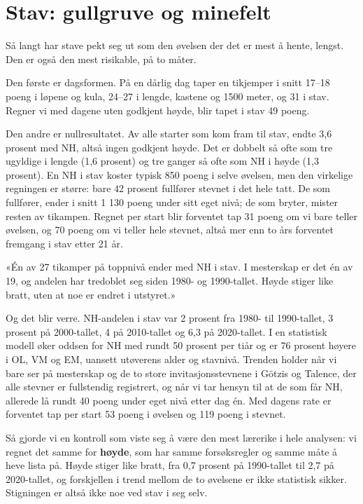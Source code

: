 \section{Stav: gullgruve og minefelt}\label{stav-gullgruve-og-minefelt}

Så langt har stave pekt seg ut som den øvelsen der det er mest å hente, lengst. Den er også den mest risikable, på to måter.

Den første er dagsformen. På en dårlig dag taper en tikjemper i snitt 17--18 poeng i løpene og kula, 24--27 i lengde, kastene og 1500 meter, og 31 i stav. Regner vi med dagene uten godkjent høyde, blir tapet i stav 49 poeng.

Den andre er nullresultatet. Av alle starter som kom fram til stav, endte 3,6 prosent med NH, altså ingen godkjent høyde. Det er dobbelt så ofte som tre ugyldige i lengde (1,6 prosent) og tre ganger så ofte som NH i høyde (1,3 prosent). En NH i stav koster typisk 850 poeng i selve øvelsen, men den virkelige regningen er større: bare 42 prosent fullfører stevnet i det hele tatt. De som fullfører, ender i snitt 1 130 poeng under sitt eget nivå; de som bryter, mister resten av tikampen. Regnet per start blir forventet tap 31 poeng om vi bare teller øvelsen, og 70 poeng om vi teller hele stevnet, altså mer enn to års forventet fremgang i stav etter 21 år.

\begin{sitat}

«Én av 27 tikamper på toppnivå ender med NH i stav. I mesterskap er det én av 19, og andelen har tredoblet seg siden 1980- og 1990-tallet. Høyde stiger like bratt, uten at noe er endret i utstyret.»

\end{sitat}

Og det blir verre. NH-andelen i stav var 2 prosent fra 1980- til 1990-tallet, 3 prosent på 2000-tallet, 4 på 2010-tallet og 6,3 på 2020-tallet. I en statistisk modell øker oddsen for NH med rundt 50 prosent per tiår og er 76 prosent høyere i OL, VM og EM, uansett utøverens alder og stavnivå. Trenden holder når vi bare ser på mesterskap og de to store invitasjonsstevnene i Götzis og Talence, der alle stevner er fullstendig registrert, og når vi tar hensyn til at de som får NH, allerede lå rundt 40 poeng under eget nivå etter dag én. Med dagens rate er forventet tap per start 53 poeng i øvelsen og 119 poeng i stevnet.

Så gjorde vi en kontroll som viste seg å være den mest lærerike i hele analysen: vi regnet det samme for \textbf{høyde}, som har samme forsøksregler og samme måte å heve lista på. Høyde stiger like bratt, fra 0,7 prosent på 1990-tallet til 2,7 på 2020-tallet, og forskjellen i trend mellom de to øvelsene er ikke statistisk sikker. Stigningen er altså ikke noe ved stav i seg selv.

